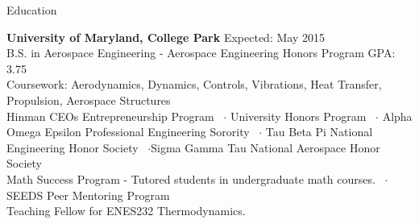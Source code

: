 \documentclass{resume} %
\begin{document}

\begin{rSection}{Education}

{\bf University of Maryland, College Park} \hfill { Expected: May 2015} \\
B.S. in Aerospace Engineering - Aerospace Engineering Honors Program \hfill {GPA: 3.75} \\
Coursework: Aerodynamics, Dynamics, Controls, Vibrations, Heat Transfer, Propulsion, Aerospace Structures\\
Hinman CEOs Entrepreneurship Program ~$\cdot$ University Honors Program ~$\cdot$  Alpha Omega Epsilon Professional Engineering Sorority ~$\cdot$ Tau Beta Pi National Engineering Honor Society ~$\cdot$Sigma Gamma Tau National Aerospace Honor Society\\
Math Success Program - Tutored students in undergraduate math courses. ~$\cdot$SEEDS Peer Mentoring Program \\
Teaching Fellow for ENES232 Thermodynamics. \\
\end{rSection}

\end{document}
